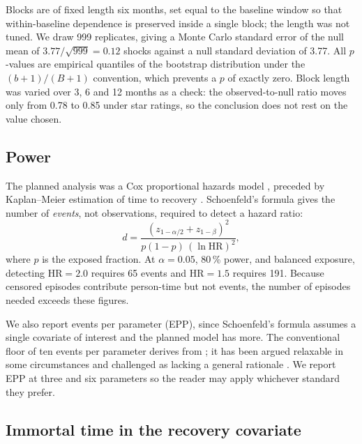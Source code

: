 \documentclass[11pt,a4paper]{article}
\makeatletter
\let\original@subsection\subsection
\renewcommand{\subsection}{\FloatBarrier\original@subsection}%
\makeatother
\begin{document}
Blocks are of fixed length six months, set equal to the baseline window so that
within-baseline dependence is preserved inside a single block; the length was
not tuned. We draw 999 replicates, giving a Monte Carlo standard error of the
null mean of $3.77/\sqrt{999} = 0.12$ shocks against a null standard deviation
of 3.77. All $p$-values are empirical quantiles of the bootstrap distribution
under the $(b+1)/(B+1)$ convention, which prevents a $p$ of exactly zero. Block
length was varied over 3, 6 and 12 months as a check: the observed-to-null
ratio moves only from 0.78 to 0.85 under star ratings, so the conclusion does
not rest on the value chosen.

\subsection{Power}

The planned analysis was a Cox proportional hazards model \citep{cox1972},
preceded by Kaplan--Meier estimation of time to recovery \citep{kaplan1958}.
Schoenfeld's formula \citep{schoenfeld1983} gives the number of \emph{events},
not observations, required to detect a hazard ratio:
\begin{equation}
d = \frac{(z_{1-\alpha/2} + z_{1-\beta})^{2}}{p(1-p)\,(\ln \mathrm{HR})^{2}},
\end{equation}
where $p$ is the exposed fraction. At $\alpha = 0.05$, 80\,\% power, and
balanced exposure, detecting $\mathrm{HR} = 2.0$ requires 65 events and
$\mathrm{HR} = 1.5$ requires 191. Because censored episodes contribute
person-time but not events, the number of episodes needed exceeds these
figures.

We also report events per parameter (EPP), since Schoenfeld's formula assumes a
single covariate of interest and the planned model has more. The conventional
floor of ten events per parameter derives from \citet{peduzzi1996}; it has been
argued relaxable in some circumstances \citep{vittinghoff2007} and challenged
as lacking a general rationale \citep{vansmeden2016}. We report EPP at three
and six parameters so the reader may apply whichever standard they prefer.

\subsection{Immortal time in the recovery covariate}
\end{document}
